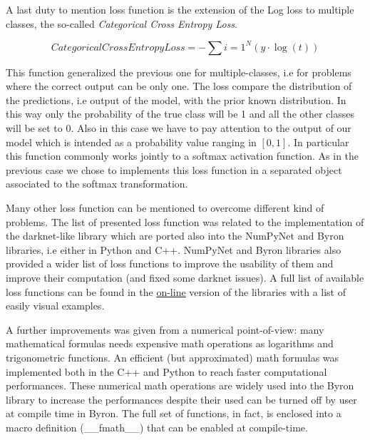 \documentclass{standalone}
\begin{document}
A last duty to mention loss function is the extension of the Log loss to multiple classes, the so-called \emph{Categorical Cross Entropy Loss}.

$$
CategoricalCrossEntropyLoss = -\sum{i=1}^{N}\left( y\cdot\log(t) \right)
$$

This function generalized the previous one for multiple-classes, i.e for problems where the correct output can be only one.
The loss compare the distribution of the predictions, i.e output of the model, with the prior known distribution.
In this way only the probability of the true class will be 1 and all the other classes will be set to 0.
Also in this case we have to pay attention to the output of our model which is intended as a probability value ranging in $[0, 1]$.
In particular this function commonly works jointly to a softmax activation function.
As in the previous case we chose to implements this loss function in a separated object associated to the softmax transformation.

Many other loss function can be mentioned to overcome different kind of problems.
The list of presented loss function was related to the implementation of the \textsf{darknet}-like library which are ported also into the \textsf{NumPyNet} and \textsf{Byron} libraries, i.e either in \textsf{Python} and \textsf{C++}.
\textsf{NumPyNet} and \textsf{Byron} libraries also provided a wider list of loss functions to improve the usability of them and improve their computation (and fixed some \textsf{darknet} issues).
A full list of available loss functions can be found in the \href{https://github.com/Nico-Curti/Byron/blob/master/src/cost_layer.cpp}{on-line} version of the libraries with a list of easily visual examples.

A further improvements was given from a numerical point-of-view: many mathematical formulas needs expensive math operations as logarithms and trigonometric functions.
An efficient (but approximated) math formulas was implemented both in the \textsf{C++} and Python to reach faster computational performances.
These numerical math operations are widely used into the \textsf{Byron} library to increase the performances despite their used can be turned off by user at compile time in \textsf{Byron}.
The full set of functions, in fact, is enclosed into a \textsf{macro} definition (\textsf{\_\_fmath\_\_}) that can be enabled at compile-time.
\end{document}
